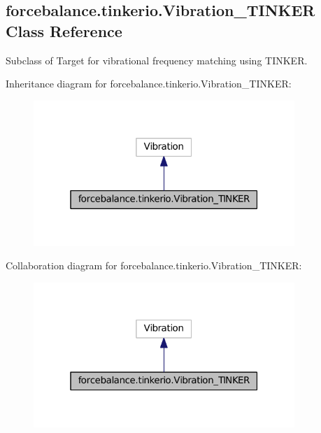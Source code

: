 \hypertarget{classforcebalance_1_1tinkerio_1_1Vibration__TINKER}{\subsection{forcebalance.\-tinkerio.\-Vibration\-\_\-\-T\-I\-N\-K\-E\-R \-Class \-Reference}
\label{classforcebalance_1_1tinkerio_1_1Vibration__TINKER}
}


\-Subclass of \-Target for vibrational frequency matching using \-T\-I\-N\-K\-E\-R.  




\-Inheritance diagram for forcebalance.\-tinkerio.\-Vibration\-\_\-\-T\-I\-N\-K\-E\-R\-:
\nopagebreak
\begin{figure}[H]
\begin{center}
\leavevmode
\includegraphics[width=280pt]{classforcebalance_1_1tinkerio_1_1Vibration__TINKER__inherit__graph}
\end{center}
\end{figure}


\-Collaboration diagram for forcebalance.\-tinkerio.\-Vibration\-\_\-\-T\-I\-N\-K\-E\-R\-:
\nopagebreak
\begin{figure}[H]
\begin{center}
\leavevmode
\includegraphics[width=280pt]{classforcebalance_1_1tinkerio_1_1Vibration__TINKER__coll__graph}
\end{center}
\end{figure}
